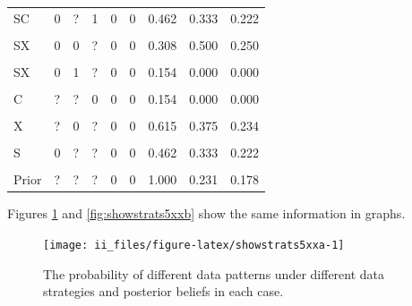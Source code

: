 \documentclass[
  12pt,
]{book}
\begin{document}
\begin{table}
\begin{tabular}[t]{lllllrrrr}
SC & 0 & ? & 1 & 0 & 0 & 0.462 & 0.333 & 0.222\\
\addlinespace
\cellcolor{gray!6}{SC} & \cellcolor{gray!6}{1} & \cellcolor{gray!6}{?} & \cellcolor{gray!6}{1} & \cellcolor{gray!6}{0} & \cellcolor{gray!6}{0} & \cellcolor{gray!6}{0.385} & \cellcolor{gray!6}{0.200} & \cellcolor{gray!6}{0.160}\\
SX & 0 & 0 & ? & 0 & 0 & 0.308 & 0.500 & 0.250\\
\cellcolor{gray!6}{SX} & \cellcolor{gray!6}{1} & \cellcolor{gray!6}{0} & \cellcolor{gray!6}{?} & \cellcolor{gray!6}{0} & \cellcolor{gray!6}{0} & \cellcolor{gray!6}{0.308} & \cellcolor{gray!6}{0.250} & \cellcolor{gray!6}{0.188}\\
SX & 0 & 1 & ? & 0 & 0 & 0.154 & 0.000 & 0.000\\
\cellcolor{gray!6}{SX} & \cellcolor{gray!6}{1} & \cellcolor{gray!6}{1} & \cellcolor{gray!6}{?} & \cellcolor{gray!6}{0} & \cellcolor{gray!6}{0} & \cellcolor{gray!6}{0.231} & \cellcolor{gray!6}{0.000} & \cellcolor{gray!6}{0.000}\\
\addlinespace
C & ? & ? & 0 & 0 & 0 & 0.154 & 0.000 & 0.000\\
\cellcolor{gray!6}{C} & \cellcolor{gray!6}{?} & \cellcolor{gray!6}{?} & \cellcolor{gray!6}{1} & \cellcolor{gray!6}{0} & \cellcolor{gray!6}{0} & \cellcolor{gray!6}{0.846} & \cellcolor{gray!6}{0.273} & \cellcolor{gray!6}{0.198}\\
X & ? & 0 & ? & 0 & 0 & 0.615 & 0.375 & 0.234\\
\cellcolor{gray!6}{X} & \cellcolor{gray!6}{?} & \cellcolor{gray!6}{1} & \cellcolor{gray!6}{?} & \cellcolor{gray!6}{0} & \cellcolor{gray!6}{0} & \cellcolor{gray!6}{0.385} & \cellcolor{gray!6}{0.000} & \cellcolor{gray!6}{0.000}\\
S & 0 & ? & ? & 0 & 0 & 0.462 & 0.333 & 0.222\\
\addlinespace
\cellcolor{gray!6}{S} & \cellcolor{gray!6}{1} & \cellcolor{gray!6}{?} & \cellcolor{gray!6}{?} & \cellcolor{gray!6}{0} & \cellcolor{gray!6}{0} & \cellcolor{gray!6}{0.538} & \cellcolor{gray!6}{0.143} & \cellcolor{gray!6}{0.122}\\
Prior & ? & ? & ? & 0 & 0 & 1.000 & 0.231 & 0.178\\
\bottomrule
\end{tabular}
\end{table}

Figures \ref{fig:showstrats5xxa} and \ref{fig:showstrats5xxb} show the same information in graphs.

\begin{figure}

{\centering \texttt{[image: ii\_files/figure-latex/showstrats5xxa-1]} 

}

\caption{The probability of different data patterns under different data strategies and posterior beliefs in each case.}\label{fig:showstrats5xxa}
\end{figure}
\end{document}
